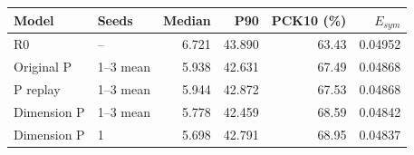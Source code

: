 \begin{tabular}{llrrrr}
\toprule
Model & Seeds & Median & P90 & PCK10 (\%) & $E_{sym}$ \\
\midrule
R0 & -- & 6.721 & 43.890 & 63.43 & 0.04952 \\
Original P & 1--3 mean & 5.938 & 42.631 & 67.49 & 0.04868 \\
P replay & 1--3 mean & 5.944 & 42.872 & 67.53 & 0.04868 \\
Dimension P & 1--3 mean & 5.778 & 42.459 & 68.59 & 0.04842 \\
Dimension P & 1 & 5.698 & 42.791 & 68.95 & 0.04837 \\
\bottomrule
\end{tabular}
